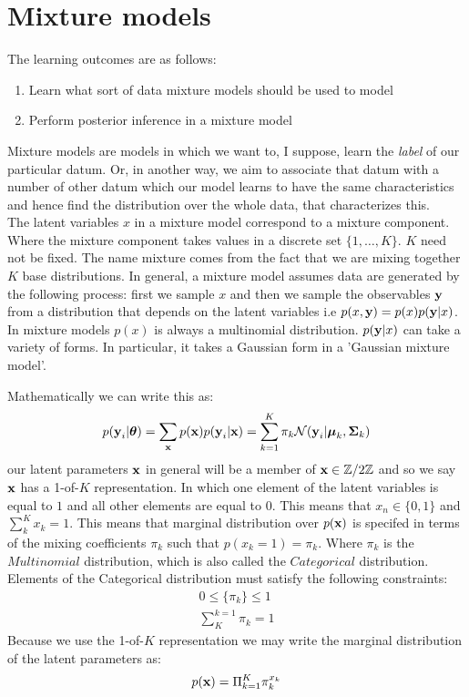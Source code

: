 
\section{Mixture models}
\label{sec:mixofgauss}
The learning outcomes are as follows:
\begin{enumerate}
	\item Learn what sort of data mixture models should be used to model
	\item Perform posterior inference in a mixture model
\end{enumerate}

Mixture models are models in which we want to, I suppose, learn the \textit{label} of our particular datum. Or, in another way, we aim to associate that datum with a number of other datum which our model learns to have the same characteristics and hence find the distribution over the whole data, that characterizes this. \\

The latent variables $x$ in a mixture model correspond to a mixture component. Where the mixture component takes values in a discrete set $\{1, \ldots, K\}$. $K$ need not be fixed.  The name mixture comes from the fact that we are mixing together $K$ base distributions. 
In general, a mixture model assumes data are generated by the following process: first we sample $x$ and then we sample the observables $\textbf{y}$ from a distribution that depends on the latent variables i.e $p(x,\textbf{y}) = p(x)p(\textbf{y}|x)$. In mixture models $p(x)$ is always a multinomial distribution. $p(\textbf{y}|x)$ can take a variety of forms. In particular, it takes a Gaussian form in a 'Gaussian mixture model'. 

Mathematically we can write this as:
\begin{equation} p(\textbf{y}_{i}|\boldsymbol{\theta}) = \sum_{\textbf{x}}p(\textbf{x})p(\textbf{y}_{i}|\textbf{x}) = \sum_{k=1}^{K} \pi_{k} \mathcal{N}(\textbf{y}_{i} | \boldsymbol{\mu}_{k},\boldsymbol{\Sigma}_{k})\end{equation}
our latent parameters $\textbf{x}$ in general will be a member of  $\textbf{x} \in \mathbb{Z} / 2\mathbb{Z}$ and so we say $\textbf{x}$ has a 1-of-$K$ representation. In which one element of the latent variables is equal to $1$ and all other elements are equal to $0$. This means that $x_{n} \in \{0,1\}$ and $\sum_{k}^{K} x_{k} = 1$.  This means that marginal distribution over $p(\textbf{x})$ is specifed in terms of the mixing coefficients $\pi_{k}$ such that $p(x_{k} = 1) = \pi_{k}$. Where $\pi_{k}$ is the $Multinomial$ distribution, which is also called the $Categorical$ distribution. Elements of the Categorical distribution must satisfy the following constraints: \begin{align}
0 \leq \{\pi_{k}\} \leq 1 \\
\sum_{K}^{k=1}\pi_{k} = 1
\end{align}
Because we use the 1-of-$K$ representation we may write the marginal distribution of the latent parameters as:
\begin{equation}
	p(\textbf{x}) = \Pi_{k=1}^{K} \pi_{k}^{x_{k}}
\end{equation}

